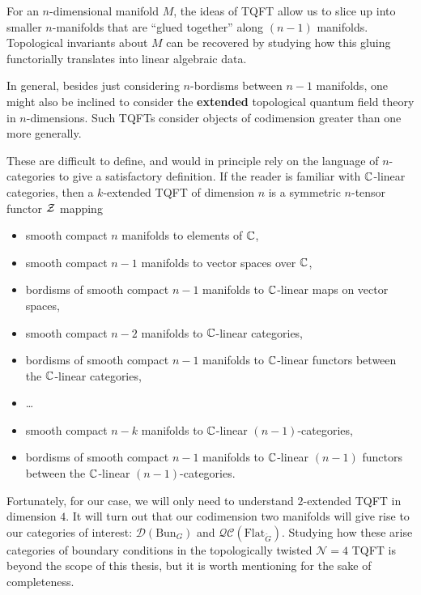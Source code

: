 	For an $n$-dimensional manifold $M$, the ideas of TQFT allow us to slice up into smaller $n$-manifolds that are ``glued together'' along $(n-1)$ manifolds. Topological invariants about $M$ can be recovered by studying how this gluing functorially translates into linear algebraic data.
	
	In general, besides just considering $n$-bordisms between $n-1$ manifolds, one might also be inclined to consider the  \textbf{extended} topological quantum field theory in $n$-dimensions. Such TQFTs consider objects of codimension greater than one more generally. 
	
	These are difficult to define, and would in principle rely on the language of $n$-categories to give a satisfactory definition. If the reader is familiar with $\mathbb{C}$-linear categories, then a $k$-extended TQFT of dimension $n$ is \cite{nlab:extended_topological_quantum_field_theory} a symmetric $n$-tensor functor $\mathcal{Z}$ mapping
	\begin{itemize}
		\item smooth compact $n$ manifolds to elements of $\mathbb{C}$,
		\item smooth compact $n-1$ manifolds to vector spaces over $\mathbb{C}$,
		\item bordisms of smooth compact $n-1$ manifolds to $\mathbb{C}$-linear maps on vector spaces,
		\item smooth compact $n-2$ manifolds to $\mathbb{C}$-linear categories,
		\item bordisms of smooth compact $n-1$ manifolds to $\mathbb{C}$-linear functors between the $\mathbb{C}$-linear categories,
		\item \dots 
		\item smooth compact $n-k$ manifolds to $\mathbb{C}$-linear $(n-1)$-categories,
		\item bordisms of smooth compact $n-1$ manifolds to $\mathbb{C}$-linear $(n-1)$ functors between the $\mathbb{C}$-linear $(n-1)$-categories.
	\end{itemize}
	
	Fortunately, for our case, we will only need to understand $2$-extended TQFT in dimension $4$. It will turn out that our codimension two manifolds will give rise to our categories of interest: $\mathcal D(\mathrm{Bun}_G)$ and $\mathcal{QC}(\mathrm{Flat}_{\check G})$. Studying how these arise categories of boundary conditions in the topologically twisted $\mathcal N=4$ TQFT is beyond the scope of this thesis, but it is worth mentioning for the sake of completeness. 
	

